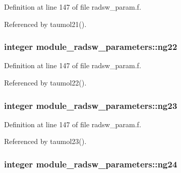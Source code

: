 Definition at line 147 of file radsw\+\_\+param.\+f.



Referenced by taumol21().

\subsubsection[{\texorpdfstring{ng22}{ng22}}]{\setlength{\rightskip}{0pt plus 5cm}integer module\+\_\+radsw\+\_\+parameters\+::ng22}\hypertarget{namespacemodule__radsw__parameters_a655c1f742fc97d58c32131e8a85cb6fd}{}\label{namespacemodule__radsw__parameters_a655c1f742fc97d58c32131e8a85cb6fd}


Definition at line 147 of file radsw\+\_\+param.\+f.



Referenced by taumol22().

\subsubsection[{\texorpdfstring{ng23}{ng23}}]{\setlength{\rightskip}{0pt plus 5cm}integer module\+\_\+radsw\+\_\+parameters\+::ng23}\hypertarget{namespacemodule__radsw__parameters_a0c4f1d2f9438850994bcedb395d07f40}{}\label{namespacemodule__radsw__parameters_a0c4f1d2f9438850994bcedb395d07f40}


Definition at line 147 of file radsw\+\_\+param.\+f.



Referenced by taumol23().

\subsubsection[{\texorpdfstring{ng24}{ng24}}]{\setlength{\rightskip}{0pt plus 5cm}integer module\+\_\+radsw\+\_\+parameters\+::ng24}\hypertarget{namespacemodule__radsw__parameters_ae25ce9a47816b83c6c57440747f1975f}{}\label{namespacemodule__radsw__parameters_ae25ce9a47816b83c6c57440747f1975f}


